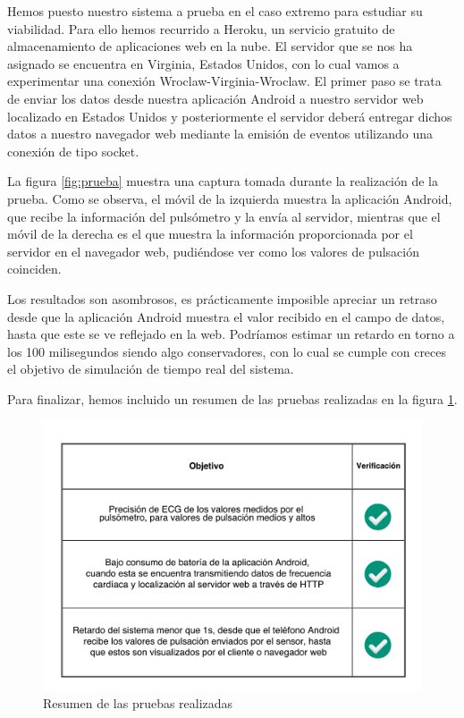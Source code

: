 Hemos puesto nuestro sistema a prueba en el caso extremo para estudiar su viabilidad. Para ello hemos recurrido a Heroku, un servicio gratuito de almacenamiento de aplicaciones web en la nube. El servidor que se nos ha asignado se encuentra en Virginia, Estados Unidos, con lo cual vamos a experimentar una conexión Wroclaw-Virginia-Wroclaw. El primer paso se trata de enviar los datos desde nuestra aplicación Android a nuestro servidor web localizado en Estados Unidos y posteriormente el servidor deberá entregar dichos datos a nuestro navegador web mediante la emisión de eventos utilizando una conexión de tipo socket.

La figura \ref{fig:prueba} muestra una captura tomada durante la realización de la prueba. Como se observa, el móvil de la izquierda muestra la aplicación Android, que recibe la información del pulsómetro y la envía al servidor, mientras que el móvil de la derecha es el que muestra la información proporcionada por el servidor en el navegador web, pudiéndose ver como los valores de pulsación coinciden.

Los resultados son asombrosos, es prácticamente imposible apreciar un retraso desde que la aplicación Android muestra el valor recibido en el campo de datos, hasta que este se ve reflejado en la web. Podríamos estimar un retardo en torno a los 100 milisegundos siendo algo conservadores, con lo cual se cumple con creces el objetivo de simulación de tiempo real del sistema.

Para finalizar, hemos incluido un resumen de las pruebas realizadas en la figura \ref{table:pruebas}.

\begin{figure}[h] \centering
	\includegraphics[width=15cm]{graphs/resumenObjetivos.pdf} \caption{Resumen de las pruebas realizadas}
	\label{table:pruebas}
\end{figure}
 
